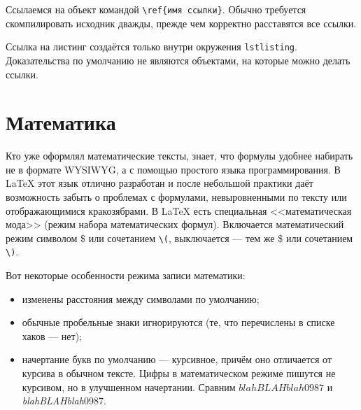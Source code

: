 \documentclass[14pt,russian]{scrartcl}
\begin{document}
Ссылаемся на объект командой \texttt{\textbackslash ref\{имя ссылки\}}. Обычно требуется скомпилировать исходник дважды, прежде чем корректно расставятся все ссылки.

Ссылка на листинг создаётся только внутри окружения \texttt{lstlisting}. Доказательства по умолчанию не являются объектами, на которые можно делать ссылки.

\section{Математика}\label{Sect::mathmode}

Кто уже оформлял математические тексты, знает, что формулы удобнее набирать не в формате WYSIWYG, а с помощью простого языка программирования. В \LaTeX{} этот язык отлично разработан и после небольшой практики даёт возможность забыть о проблемах с формулами, невыровненными по тексту или отображающимися кракозябрами. В \LaTeX{} есть специальная <<математическая мода>> (режим набора математических формул). Включается математический режим символом \$ или сочетанием \texttt{\textbackslash(}, выключается --- тем же \$ или сочетанием \texttt{\textbackslash)}. 

Вот некоторые особенности режима записи математики:
\begin{itemize}
\item изменены расстояния между символами по умолчанию;
\item обычные пробельные знаки игнорируются (те, что перечислены в списке хаков --- нет);
\item начертание букв по умолчанию --- курсивное, причём оно отличается от курсива в обычном тексте. Цифры в математическом режиме пишутся не курсивом, но в улучшенном начертании. Сравним $blahBLAHblah0987$ и \textit{blahBLAHblah}0987.
\end{itemize}
\end{document}
